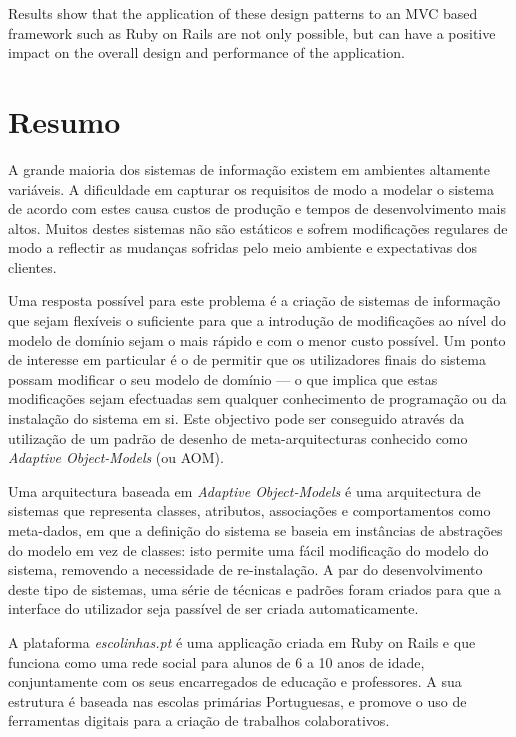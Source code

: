 Results show that the application of these design patterns to an MVC based framework such as Ruby on Rails are not only possible, but can have a positive impact on the overall design and performance of the application.

\chapter*{Resumo}

A grande maioria dos sistemas de informação existem em ambientes altamente variáveis. A dificuldade em capturar os requisitos de modo a modelar o sistema de acordo com estes causa custos de produção e tempos de desenvolvimento mais altos. Muitos destes sistemas não são estáticos e sofrem modificações regulares de modo a reflectir as mudanças sofridas pelo meio ambiente e expectativas dos clientes.

Uma resposta possível para este problema é a criação de sistemas de informação que sejam flexíveis o suficiente para que a introdução de modificações ao nível do modelo de domínio sejam o mais rápido e com o menor custo possível. Um ponto de interesse em particular é o de permitir que os utilizadores finais do sistema possam modificar o seu modelo de domínio --- o que implica que estas modificações sejam efectuadas sem qualquer conhecimento de programação ou da instalação do sistema em si. Este objectivo pode ser conseguido através da utilização de um padrão de desenho de meta-arquitecturas conhecido como \textit{Adaptive Object-Models} (ou AOM).

Uma arquitectura baseada em \textit{Adaptive Object-Models} é uma arquitectura de sistemas que representa classes, atributos, associações e comportamentos como meta-dados, em que a definição do sistema se baseia em instâncias de abstrações do modelo em vez de classes: isto permite uma fácil modificação do modelo do sistema, removendo a necessidade de re-instalação. A par do desenvolvimento deste tipo de sistemas, uma série de técnicas e padrões foram criados para que a interface do utilizador seja passível de ser criada automaticamente.

A plataforma \emph{escolinhas.pt} é uma applicação criada em Ruby on Rails e que funciona como uma rede social para alunos de 6 a 10 anos de idade, conjuntamente com os seus encarregados de educação e professores. A sua estrutura é baseada nas escolas primárias Portuguesas, e promove o uso de ferramentas digitais para a criação de trabalhos colaborativos.

